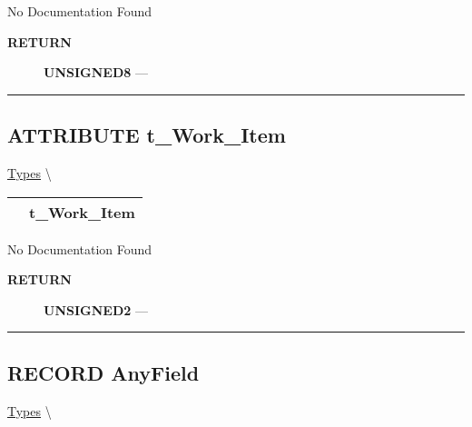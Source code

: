 No Documentation Found








\par
\begin{description}
\item [\colorbox{tagtype}{\color{white} \textbf{\textsf{RETURN}}}] \textbf{UNSIGNED8} --- 
\end{description}




\rule{\linewidth}{0.5pt}
\subsection*{\textsf{\colorbox{headtoc}{\color{white} ATTRIBUTE}
t\_Work\_Item}}

\hypertarget{ecldoc:ml_core.types.t_work_item}{}
\hspace{0pt} \hyperlink{ecldoc:ML_Core.Types}{Types} \textbackslash 

{\renewcommand{\arraystretch}{1.5}
\begin{tabularx}{\textwidth}{|>{\raggedright\arraybackslash}l|X|}
\hline
\hspace{0pt}\mytexttt{\color{red} } & \textbf{t\_Work\_Item} \\
\hline
\end{tabularx}
}

\par





No Documentation Found








\par
\begin{description}
\item [\colorbox{tagtype}{\color{white} \textbf{\textsf{RETURN}}}] \textbf{UNSIGNED2} --- 
\end{description}




\rule{\linewidth}{0.5pt}
\subsection*{\textsf{\colorbox{headtoc}{\color{white} RECORD}
AnyField}}

\hypertarget{ecldoc:ml_core.types.anyfield}{}
\hspace{0pt} \hyperlink{ecldoc:ML_Core.Types}{Types} \textbackslash 

